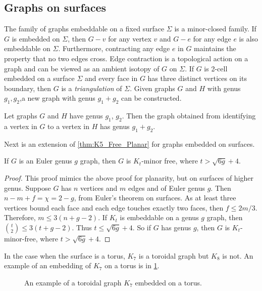 \subsection{Graphs on surfaces}
The family of graphs embeddable on a fixed surface $\Sigma$ is a minor-closed family. If $G$ is embedded on $\Sigma$, then $G - v$ for any vertex $v$ and $G - e$ for any edge $e$ is also embeddable on $\Sigma$. Furthermore, contracting any edge $e$ in $G$ maintains the property that no two edges cross. Edge contraction is a topological action on a graph and can be viewed as an ambient isotopy of $G$ on $\Sigma$. 
If $G$ is 2-cell embedded on a surface $\Sigma$ and every face in $G$ has three distinct vertices on its boundary, then $G$ is a \textit{triangulation} of $\Sigma$. Given graphs $G$ and $H$ with genus $g_1, g_2$,a new graph with genus $g_1 + g_2$ can be constructed.
\begin{theorem}\label{thm:additivity_genus}
	Let graphs $G$ and $H$ have genus $g_1$, $g_2$. Then the graph obtained from identifying a vertex in $G$ to a vertex in $H$ has genus $g_1 + g_2$. 
\end{theorem}

Next is an extension of \cref{thm:K5_Free_Planar} for graphs embedded on surfaces. 

\begin{theorem}\label{thm:bounded_genus_kt_free}
	If \(G\) is an Euler genus \(g\) graph, then \(G\) is \(K_t\)-minor free, where \(t > \sqrt{6g} + 4\). 
\end{theorem}
\begin{proof}
	This proof mimics the above proof for planarity, but on surfaces of higher genus. 
	Suppose \(G\) has \(n\) vertices and \(m\) edges and of Euler genus $g$. Then \(n - m + f = \chi = 2-g\), from Euler's theorem on surfaces. As at least three vertices bound each face and each edge touches exactly two faces, then \(f \leq 2m/3\). Therefore, \(m \leq 3(n + g - 2)\). If \(K_t\) is embeddable on a genus \(g\) graph, then \(\binom{t}{2} \leq 3 (t + g - 2)\). Thus \(t \leq \sqrt{6g} + 4\). So if $G$ has genus \(g\), then $G$ is \(K_t\)-minor-free, where \(t > \sqrt{6g} + 4\). 
\end{proof}

In the case when the surface is a torus, $K_7$ is a toroidal graph but $K_8$ is not. An example of an embedding of $K_7$ on a torus is in \cref{fig:k7_on_torus}.

\begin{figure}[h!]
	\centering
	
	\caption[Toroidal graph]{An example of a toroidal graph $K_7$ embedded on a torus.}\label{fig:k7_on_torus}
\end{figure}

